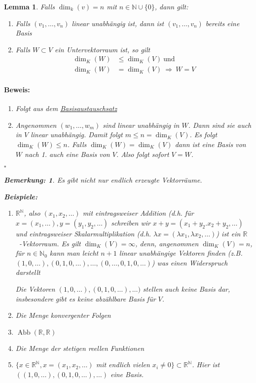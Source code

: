 \documentclass{report}
\newcommand{\lb}{\lambda}
\newcommand{\R}{\mathbb{R}}
\newcommand{\N}{\mathbb{N}}
\newcommand{\mR}{$\mathbb{R}$\ }
\DeclareMathOperator{\abb}{Abb}
\theoremstyle{customrem}
\newtheorem*{bem}{Bemerkung:}
\theoremstyle{customdef}
\newtheorem{lemma}[definition]{Lemma}
\renewenvironment{proof}{\vspace{-.75cm}\paragraph{Beweis: }}{\vspace{-.5cm}\hfill$\square$}
\begin{document}
	\begin{lemma}
		Falls $\dim_k(v) = n$ mit $n \in \N \cup \{0\}$, dann gilt:
		\begin{enumerate}
			\item Falls $(v_1, \dots, v_n)$ linear unabhängig ist, dann ist $(v_1, \ldots, v_n)$ bereits eine Basis
			\item Falls $W \subset V$ ein Untervektorraum ist, so gilt
			\begin{align*}
				\dim_K(W) &\le \dim_K(V)\ \text{und}\\
				\dim_K(W) &= \dim_K(V)\ \Rightarrow \ W = V
			\end{align*}
		\end{enumerate}
		\vspace{.2cm}
		\begin{proof}
			\begin{enumerate}
				\item Folgt aus dem \hyperref[satz215]{Basisaustauschsatz}
				\item Angenommen $(w_1, \dots, w_m)$ sind linear unabhängig in $W$. Dann sind sie auch in $V$ linear unabhängig. Damit folgt $m \leq n = \dim_K(V)$. Es folgt $\dim_K(W) \leq n$. Falls $\dim_K(W) = \dim_K(V)$ dann ist eine Basis von $W$ nach 1. auch eine Basis von $V$. Also folgt sofort $V = W$.
			\end{enumerate}
		\end{proof}
		\begin{bem}
			Es gibt nicht nur endlich erzeugte Vektorräume.\\
		\end{bem}
		\begin{minipage}{\textwidth}
			\textbf{Beispiele: }
			\begin{enumerate}
				\item $\R^\N$, also $(x_1, x_2, \ldots)$ mit eintragsweiser Addition (d.h. für $x = (x_1, \ldots), y = (y_1, y_2, \ldots)$ schreiben wir $x + y = (x_1 + y_2. x_2 + y_2, \ldots)$ und eintragsweiser Skalarmultiplikation (d.h. $\lb x = (\lb x_1, \lb x_2, \ldots)$) ist ein \mR -Vektorraum. Es gilt $\dim_K(V) = \infty$, denn, angenommen $\dim_K(V) = n$, für $n \in \N_0$ kann man leicht $n + 1$ linear unabhängige Vektoren finden (z.B. $(1, 0, \ldots), (0, 1, 0, \ldots), \dots, (0, \ldots, 0, 1, 0, \ldots)$) was einen Widerspruch darstellt \Lightning
				
				Die Vektoren $(1, 0, \dots), (0, 1, 0, \dots), \dots)$ stellen auch keine Basis dar, insbesondere gibt es keine abzählbare Basis für $V$.
				\item Die Menge konvergenter Folgen
				\item $\abb(\R, \R)$
				\item Die Menge der stetigen reellen Funktionen
				\item  $\{x \in \R^\N, x = (x_1, x_2, \dots)$ mit endlich vielen $x_i \neq 0\} \subset \R^\N$. Hier ist $((1, 0, \dots), (0, 1, 0, \dots), \dots)$ eine Basis.
			\end{enumerate}
		\end{minipage}

	\end{lemma}
\end{document}
